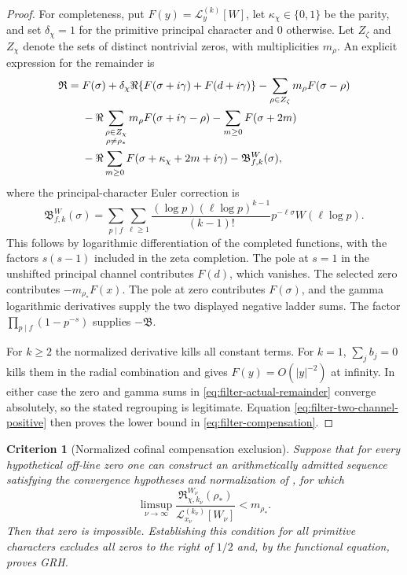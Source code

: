 \documentclass[11pt]{article}
\newtheorem{criterion}[theorem]{Criterion}
\theoremstyle{definition}
\theoremstyle{remark}
\begin{document}
\begin{proof}
For completeness, put $F(y)=\mathcal L_y^{(k)}[W]$, let
$\kappa_\chi\in\{0,1\}$ be the parity, and set $\delta_\chi=1$ for
the primitive principal character and $0$ otherwise.  Let $Z_\zeta$ and $Z_\chi$ denote the sets of distinct nontrivial
zeros, with multiplicities $m_\rho$.  An explicit
expression for the remainder is
\begin{align}
 \mathfrak R={}&F(\sigma)
 +\delta_\chi\Re\{F(\sigma+i\gamma)+F(d+i\gamma)\}
 -\sum_{\rho\in Z_\zeta}m_\rho F(\sigma-\rho)\notag\\
 &-\Re\sum_{\substack{\rho\in Z_\chi\\\rho\ne\rho_*}}
          m_\rho F(\sigma+i\gamma-\rho)
 -\sum_{m\ge0}F(\sigma+2m)\notag\\
 &-\Re\sum_{m\ge0}F(\sigma+\kappa_\chi+2m+i\gamma)
 -\mathfrak B_{f,k}^W(\sigma),
 \label{eq:filter-actual-remainder}
\end{align}
where the principal-character Euler correction is
\[
 \mathfrak B_{f,k}^W(\sigma)=
 \sum_{p\mid f}\sum_{\ell\ge1}
 \frac{(\log p)(\ell\log p)^{k-1}}{(k-1)!}
 p^{-\ell\sigma}W(\ell\log p).
\]
This follows by logarithmic differentiation of the completed functions,
with the factors $s(s-1)$ included in the zeta completion.  The pole
at $s=1$ in the unshifted principal channel contributes $F(d)$, which
vanishes.  The selected zero contributes $-m_{\rho_*}F(x)$.  The pole
at zero contributes $F(\sigma)$, and the gamma logarithmic derivatives
supply the two displayed negative ladder sums.  The factor
$\prod_{p\mid f}(1-p^{-s})$ supplies $-\mathfrak B$.

For $k\ge2$ the normalized derivative kills all constant terms.  For
$k=1$, $\sum_jb_j=0$ kills them in the radial combination and gives
$F(y)=O(|y|^{-2})$ at infinity.  In either case the zero and gamma sums
in \eqref{eq:filter-actual-remainder} converge absolutely, so the stated
regrouping is legitimate.  Equation \eqref{eq:filter-two-channel-positive}
then proves the lower bound in \eqref{eq:filter-compensation}.
\end{proof}

\begin{criterion}[Normalized cofinal compensation exclusion]
\label{crit:filter-cofinal-compensation}
Suppose that for every hypothetical off-line zero one can construct an
arithmetically admitted sequence satisfying the convergence hypotheses and
normalization of , for which
\begin{equation}
 \limsup_{\nu\to\infty}
 \frac{\mathfrak R_{\chi,k_\nu}^{W_\nu}(\rho_*)}
      {\mathcal L_{x_\nu}^{(k_\nu)}[W_\nu]}<m_{\rho_*}.
 \label{eq:filter-cofinal-gap}
\end{equation}
Then that zero is impossible.  Establishing this condition for all
primitive characters excludes all zeros to the right of $1/2$ and,
by the functional equation, proves GRH.
\end{criterion}
\end{document}
